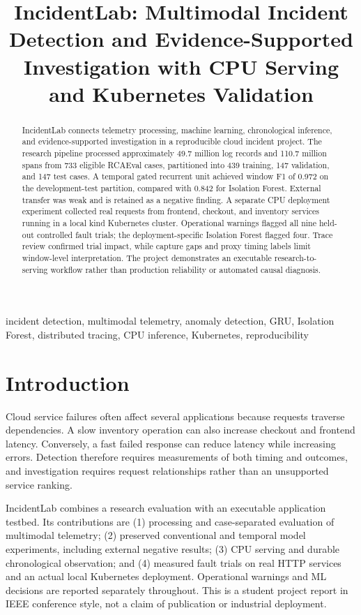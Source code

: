 \documentclass[conference]{IEEEtran}
\title{IncidentLab: Multimodal Incident Detection and Evidence-Supported Investigation with CPU Serving and Kubernetes Validation}
\author{\IEEEauthorblockN{Amikula Pavan Kumar Goud}
\IEEEauthorblockA{MSc Computer Science Student\\Blekinge Institute of Technology\\Karlskrona, Sweden}}
\begin{document}
\maketitle
\begin{abstract}
IncidentLab connects telemetry processing, machine learning, chronological inference, and evidence-supported investigation in a reproducible cloud incident project. The research pipeline processed approximately 49.7 million log records and 110.7 million spans from 733 eligible RCAEval cases, partitioned into 439 training, 147 validation, and 147 test cases. A temporal gated recurrent unit achieved window F1 of 0.972 on the development-test partition, compared with 0.842 for Isolation Forest. External transfer was weak and is retained as a negative finding. A separate CPU deployment experiment collected real requests from frontend, checkout, and inventory services running in a local kind Kubernetes cluster. Operational warnings flagged all nine held-out controlled fault trials; the deployment-specific Isolation Forest flagged four. Trace review confirmed trial impact, while capture gaps and proxy timing labels limit window-level interpretation. The project demonstrates an executable research-to-serving workflow rather than production reliability or automated causal diagnosis.
\end{abstract}
\begin{IEEEkeywords}
incident detection, multimodal telemetry, anomaly detection, GRU, Isolation Forest, distributed tracing, CPU inference, Kubernetes, reproducibility
\end{IEEEkeywords}

\section{Introduction}
Cloud service failures often affect several applications because requests traverse dependencies. A slow inventory operation can also increase checkout and frontend latency. Conversely, a fast failed response can reduce latency while increasing errors. Detection therefore requires measurements of both timing and outcomes, and investigation requires request relationships rather than an unsupported service ranking.

IncidentLab combines a research evaluation with an executable application testbed. Its contributions are (1) processing and case-separated evaluation of multimodal telemetry; (2) preserved conventional and temporal model experiments, including external negative results; (3) CPU serving and durable chronological observation; and (4) measured fault trials on real HTTP services and an actual local Kubernetes deployment. Operational warnings and ML decisions are reported separately throughout. This is a student project report in IEEE conference style, not a claim of publication or industrial deployment.
\end{document}
